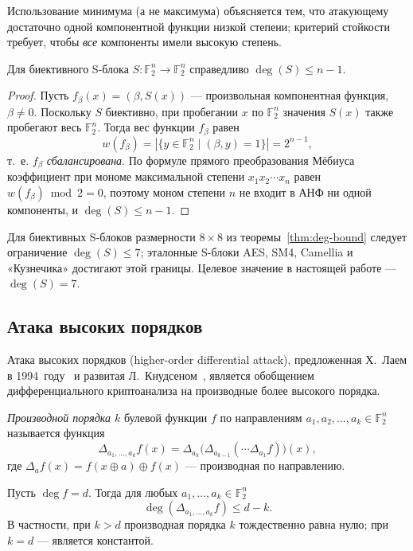 Использование минимума (а не максимума) объясняется тем, что атакующему
достаточно одной компонентной функции низкой степени; критерий
стойкости требует, чтобы \emph{все} компоненты имели высокую степень.

\begin{theorem}
\label{thm:deg-bound}
Для биективного S-блока $S: \mathbb{F}_2^n \to \mathbb{F}_2^n$
справедливо $\deg(S) \leq n - 1$.
\end{theorem}

\begin{proof}
Пусть $f_\beta(x) = (\beta, S(x))$ — произвольная компонентная функция,
$\beta \neq 0$. Поскольку $S$ биективно, при пробегании $x$ по
$\mathbb{F}_2^n$ значения $S(x)$ также пробегают весь $\mathbb{F}_2^n$.
Тогда вес функции $f_\beta$ равен
\[
    w(f_\beta) = |\{y \in \mathbb{F}_2^n \mid (\beta, y) = 1\}| = 2^{n-1},
\]
т.~е. $f_\beta$ \emph{сбалансирована}. По формуле прямого преобразования
Мёбиуса коэффициент при мономе максимальной степени $x_1 x_2 \cdots x_n$
равен $w(f_\beta) \bmod 2 = 0$, поэтому моном степени $n$ не входит в
АНФ ни одной компоненты, и $\deg(S) \leq n - 1$.
\end{proof}

Для биективных S-блоков размерности $8 \times 8$ из
теоремы~\ref{thm:deg-bound} следует ограничение $\deg(S) \leq 7$;
эталонные S-блоки AES, SM4, Camellia и «Кузнечика» достигают этой
границы. Целевое значение в настоящей работе — $\deg(S) = 7$.

\subsection{Атака высоких порядков}

Атака высоких порядков (higher-order differential attack), предложенная
Х.~Лаем в 1994~году~\cite{lai1994higher} и развитая
Л.~Кнудсеном~\cite{knudsen1995truncated}, является обобщением
дифференциального криптоанализа на производные более высокого
порядка.

\begin{definition}
\emph{Производной порядка $k$} булевой функции $f$ по направлениям
$a_1, a_2, \dots, a_k \in \mathbb{F}_2^n$ называется функция
\[
    \Delta_{a_1, \dots, a_k} f(x) = \Delta_{a_k} \bigl(\Delta_{a_{k-1}} (\cdots \Delta_{a_1} f)\bigr)(x),
\]
где $\Delta_a f(x) = f(x \oplus a) \oplus f(x)$ — производная по
направлению.
\end{definition}

\begin{theorem}
\label{thm:hod}
Пусть $\deg f = d$. Тогда для любых $a_1, \dots, a_k \in \mathbb{F}_2^n$
\[
    \deg(\Delta_{a_1, \dots, a_k} f) \leq d - k.
\]
В частности, при $k > d$ производная порядка $k$ тождественно равна
нулю; при $k = d$ — является константой.
\end{theorem}

